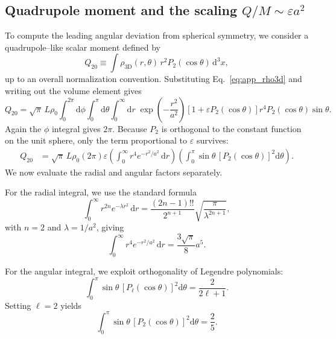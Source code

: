 \documentclass[12pt]{article}
\begin{document}
\subsection{Quadrupole moment and the scaling \texorpdfstring{$Q/M \sim \varepsilon a^2$}{Q/M ~ epsilon a squared}}

To compute the leading angular deviation from spherical symmetry, we
consider a quadrupole--like scalar moment defined by
\begin{equation}
  Q_{20}
  \equiv \int \rho_{\mathrm{3D}}(r,\theta)\,
           r^2 P_2(\cos\theta)\,\mathrm{d}^3x,
  \label{eq:app_q20_def}
\end{equation}
up to an overall normalization convention.  Substituting
Eq.~\eqref{eq:app_rho3d} and writing out the volume element gives
\begin{equation}
  Q_{20}
  = \sqrt{\pi}\,L\rho_0
    \int_0^{2\pi}\!\mathrm{d}\phi
    \int_0^{\pi}\!\mathrm{d}\theta
    \int_0^{\infty}\!\mathrm{d}r\;
      \exp\!\left(-\frac{r^2}{a^2}\right)
      \left[1 + \varepsilon P_2(\cos\theta)\right]
      r^4 P_2(\cos\theta)\sin\theta.
\end{equation}
Again the $\phi$ integral gives $2\pi$.  Because $P_2$ is orthogonal to the
constant function on the unit sphere, only the term proportional to
$\varepsilon$ survives:
\begin{align}
  Q_{20}
  &= \sqrt{\pi}\,L\rho_0
     (2\pi)\varepsilon
     \left(
       \int_0^{\infty}
         r^4 e^{-r^2/a^2}\,\mathrm{d}r
     \right)
     \left(
       \int_0^{\pi}
         \sin\theta\,[P_2(\cos\theta)]^2 \mathrm{d}\theta
     \right).
\end{align}
We now evaluate the radial and angular factors separately.

For the radial integral, we use the standard formula
\begin{equation}
  \int_0^{\infty}
    r^{2n} e^{-\lambda r^2}\,\mathrm{d}r
  = \frac{(2n-1)!!}{2^{n+1}}\sqrt{\frac{\pi}{\lambda^{2n+1}}},
\end{equation}
with $n=2$ and $\lambda = 1/a^2$, giving
\begin{equation}
  \int_0^{\infty}
    r^4 e^{-r^2/a^2}\,\mathrm{d}r
  = \frac{3\sqrt{\pi}}{8}a^5.
\end{equation}

For the angular integral, we exploit orthogonality of Legendre polynomials:
\begin{equation}
  \int_0^{\pi}
    \sin\theta\,[P_\ell(\cos\theta)]^2\mathrm{d}\theta
  = \frac{2}{2\ell+1}.
\end{equation}
Setting $\ell=2$ yields
\begin{equation}
  \int_0^{\pi}
    \sin\theta\,[P_2(\cos\theta)]^2\mathrm{d}\theta
  = \frac{2}{5}.
\end{equation}
\end{document}

